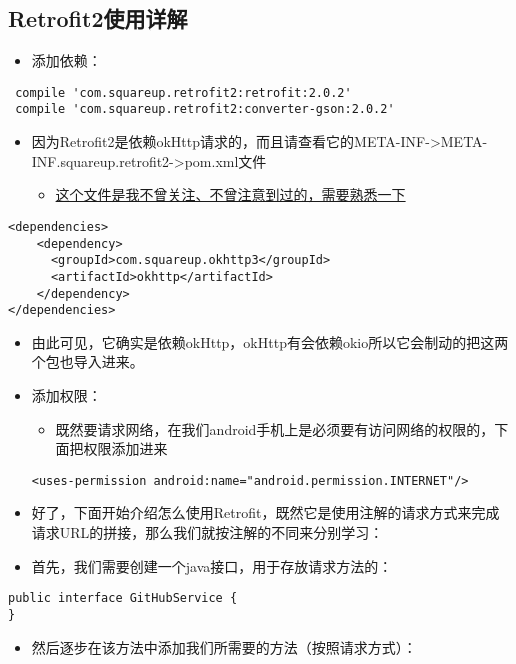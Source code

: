 \documentclass[9pt, b5paper]{article}
\begin{document}
\subsection{Retrofit2使用详解}
\label{sec-1-2}
\begin{itemize}
\item 添加依赖：
\end{itemize}
\begin{verbatim}
 compile 'com.squareup.retrofit2:retrofit:2.0.2'
 compile 'com.squareup.retrofit2:converter-gson:2.0.2'
\end{verbatim}
\begin{itemize}
\item 因为Retrofit2是依赖okHttp请求的，而且请查看它的META-INF->META-INF\maven\com.squareup.retrofit2\retrofit->pom.xml文件
\begin{itemize}
\item \uline{这个文件是我不曾关注、不曾注意到过的，需要熟悉一下}
\end{itemize}
\end{itemize}
\begin{verbatim}
<dependencies>
    <dependency>
      <groupId>com.squareup.okhttp3</groupId>
      <artifactId>okhttp</artifactId>
    </dependency>
</dependencies>
\end{verbatim}
\begin{itemize}
\item 由此可见，它确实是依赖okHttp，okHttp有会依赖okio所以它会制动的把这两个包也导入进来。
\item 添加权限：
\begin{itemize}
\item 既然要请求网络，在我们android手机上是必须要有访问网络的权限的，下面把权限添加进来
\end{itemize}
\begin{verbatim}
<uses-permission android:name="android.permission.INTERNET"/>
\end{verbatim}
\item 好了，下面开始介绍怎么使用Retrofit，既然它是使用注解的请求方式来完成请求URL的拼接，那么我们就按注解的不同来分别学习：
\item 首先，我们需要创建一个java接口，用于存放请求方法的：
\end{itemize}
\begin{verbatim}
public interface GitHubService {
}
\end{verbatim}
\begin{itemize}
\item 然后逐步在该方法中添加我们所需要的方法（按照请求方式）：
\end{itemize}
\end{document}
